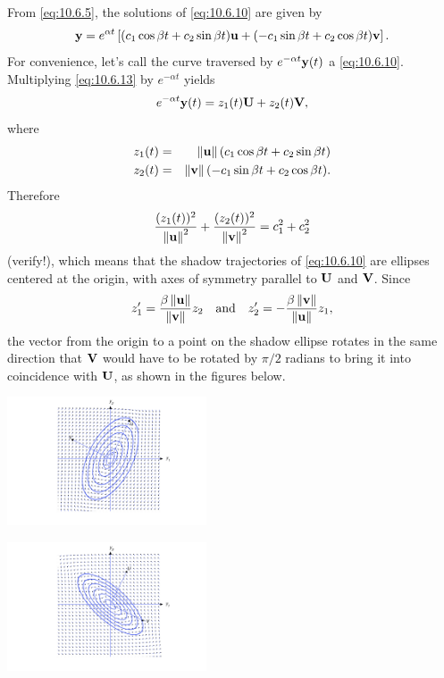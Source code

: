 \documentclass{ximera}
\begin{document}
From \eqref{eq:10.6.5}, the solutions of \eqref{eq:10.6.10} are given by
\begin{equation} \label{eq:10.6.13} {\bf y}=e^{\alpha t}\left[(c_1\cos\beta
t+c_2\sin\beta t){\bf u} +(-c_1\sin\beta t+c_2\cos\beta t){\bf
v}\right]. 
\end{equation} 
For convenience, let's call the curve
traversed by $e^{-\alpha t}{\bf y}(t)$ a 
\eqref{eq:10.6.10}. Multiplying \eqref{eq:10.6.13} by $e^{-\alpha t}$ yields
$$
e^{-\alpha t}{\bf y}(t)=z_1(t){\bf U}+z_2(t){\bf V},
$$
where
\begin{eqnarray*}
z_1(t)&=&\left\lVert{\bf u}\right\rVert(c_1\cos\beta t+c_2\sin\beta
t)\\ z_2(t)&=&\left\lVert{\bf v}\right\rVert(-c_1\sin\beta t+c_2\cos\beta t).
\end{eqnarray*}
Therefore
$$ \frac{(z_1(t))^2}{\left\lVert{\bf
u}\right\rVert^2}+\frac{(z_2(t))^2}{\left\lVert{\bf v}\right\rVert^2} =c_1^2+c_2^2
$$
(verify!), which means that the shadow trajectories of \eqref{eq:10.6.10}
are ellipses centered at the origin, with axes of symmetry parallel to
${\bf U}$ and ${\bf V}$. Since
$$
z_1'=\frac{\beta\left\lVert{\bf u}\right\rVert}{\left\lVert{\bf v}\right\rVert} z_2\quad\mbox{and}\quad
z_2'=-\frac{\beta\left\lVert{\bf v}\right\rVert}{\left\lVert{\bf u}\right\rVert} z_1,
$$
 the vector from the
origin to a point on the shadow ellipse rotates in the same direction
that ${\bf V}$ would have to be rotated by $\pi/2$ radians to bring it
into coincidence with ${\bf U}$, as shown in the figures below.

\begin{image}
 \includegraphics[height=1.5in]{fig100601.jpg} 
\end{image}

\begin{image}
 \includegraphics[height=1.5in]{fig100602.jpg} 
\end{image}
\end{document}
